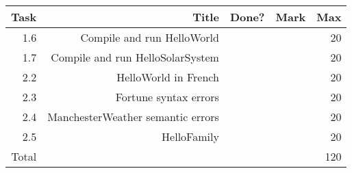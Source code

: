 \\ \\ \\ \noindent\parbox[l]{\textwidth}{
 \\ \\
\begin{tabular}{||r|r|r|r|r||} \hline \hline
Task  & Title                            & Done? & Mark & Max \\ \hline
1.6 & Compile and run HelloWorld & & & 20 \\ \hline
1.7 & Compile and run HelloSolarSystem & & & 20 \\ \hline
2.2 & HelloWorld in French & & & 20 \\ \hline
2.3 & Fortune syntax errors & & & 20 \\ \hline
2.4 & ManchesterWeather semantic errors & & & 20 \\ \hline
2.5 & HelloFamily & & & 20 \\ \hline
\hline
Total &                                  &       &      & 120 \\ \hline
\hline
\end{tabular} \\ \\
}
